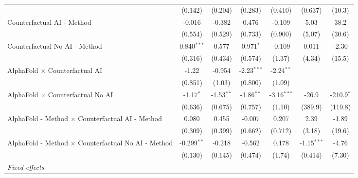 \begin{tabular}{lcccccc}
                                                              & (0.142)       & (0.204)      & (0.283)       & (0.410)       & (0.637)       & (10.3)\\   
   Counterfactual AI - Method                                 & -0.016        & -0.382       & 0.476         & -0.109        & 5.03          & 38.2\\   
                                                              & (0.554)       & (0.529)      & (0.733)       & (0.900)       & (5.07)        & (30.6)\\   
   Counterfactual No AI - Method                              & 0.840$^{***}$ & 0.577        & 0.971$^{*}$   & -0.109        & 0.011         & -2.30\\   
                                                              & (0.316)       & (0.434)      & (0.574)       & (1.37)        & (4.34)        & (15.5)\\   
   AlphaFold $\times$ Counterfactual AI                       & -1.22         & -0.954       & -2.23$^{***}$ & -2.24$^{**}$  &               &   \\   
                                                              & (0.851)       & (1.03)       & (0.800)       & (1.09)        &               &   \\   
   AlphaFold $\times$ Counterfactual No AI                    & -1.17$^{*}$   & -1.53$^{**}$ & -1.86$^{**}$  & -3.16$^{***}$ & -26.9         & -210.9$^{*}$\\   
                                                              & (0.636)       & (0.675)      & (0.757)       & (1.10)        & (389.9)       & (119.8)\\   
   AlphaFold - Method $\times$ Counterfactual AI - Method     & 0.080         & 0.455        & -0.007        & 0.207         & 2.39          & -1.89\\   
                                                              & (0.309)       & (0.399)      & (0.662)       & (0.712)       & (3.18)        & (19.6)\\   
   AlphaFold - Method $\times$ Counterfactual No AI - Method  & -0.299$^{**}$ & -0.218       & -0.562        & 0.178         & -1.15$^{***}$ & -4.76\\   
                                                              & (0.130)       & (0.145)      & (0.474)       & (1.74)        & (0.414)       & (7.30)\\   
   \midrule
   \emph{Fixed-effects}\\

\end{tabular}
